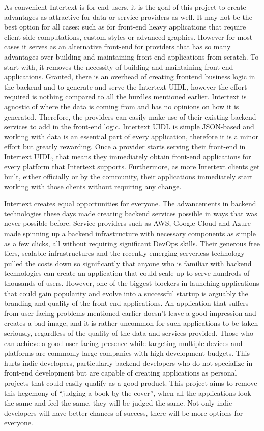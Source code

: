 As convenient Intertext is for end users, it is the goal of this project to create advantages as attractive for data or service providers as well. It may not be the best option for all cases; such as for front-end heavy applications that require client-side computations, custom styles or advanced graphics. However for most cases it serves as an alternative front-end for providers that has so many advantages over building and maintaining front-end applications from scratch. To start with, it removes the necessity of building and maintaining front-end applications. Granted, there is an overhead of creating frontend business logic in the backend and to generate and serve the Intertext UIDL, however the effort required is nothing compared to all the hurdles mentioned earlier. Intertext is agnostic of where the data is coming from and has no opinions on how it is generated. Therefore, the providers can easily make use of their existing backend services to add in the front-end logic. Intertext UIDL is simple JSON-based and working with data is an essential part of every application, therefore it is a minor effort but greatly rewarding. Once a provider starts serving their front-end in Intertext UIDL, that means they immediately obtain front-end applications for every platform that Intertext supports. Furthermore, as more Intertext clients get built, either officially or by the community, their applications immediately start working with those clients without requiring any change. 

Intertext creates equal opportunities for everyone. The advancements in backend technologies these days made creating backend services possible in ways that was never possible before. Service providers such as AWS, Google Cloud and Azure made spinning up a backend infrastructure with necessary components as simple as a few clicks, all without requiring significant DevOps skills. Their generous free tiers, scalable infrastructures and the recently emerging serverless technology pulled the costs down so significantly that anyone who is familiar with backend technologies can create an application that could scale up to serve hundreds of thousands of users. However, one of the biggest blockers in launching applications that could gain popularity and evolve into a successful startup is arguably the branding and quality of the front-end applications. An application that suffers from user-facing problems mentioned earlier doesn’t leave a good impression and creates a bad image, and it is rather uncommon for such applications to be taken seriously, regardless of the quality of the data and services provided. Those who can achieve a good user-facing presence while targeting multiple devices and platforms are commonly large companies with high development budgets. This hurts indie developers, particularly backend developers who do not specialize in front-end development but are capable of creating applications as personal projects that could easily qualify as a good product. This project aims to remove this hegemony of “judging a book by the cover”, when all the applications look the same and feel the same, they will be judged the same. Not only indie developers will have better chances of success, there will be more options for everyone.

